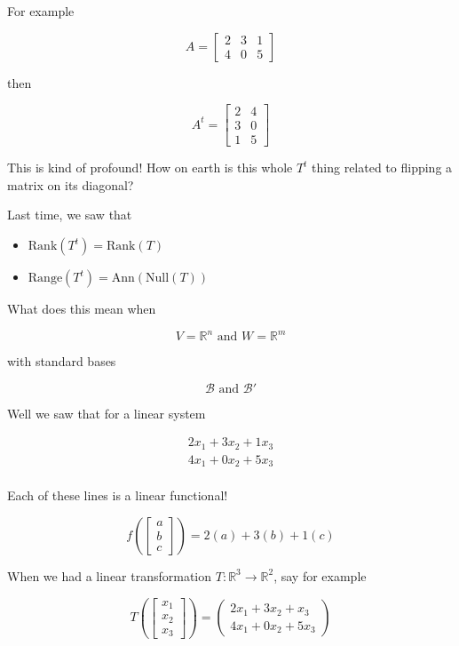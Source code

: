 \documentclass[12pt]{article}
\def\R{{\mathbb R}}
\newcommand{\rank}{\mathrm{Rank}}
\def\Ann{\text{Ann}}
\def\B{\mathcal B}
\def\range{\text{Range}}
\def\Null{\text{Null}}
\begin{document}
  For example

  \[
    A = \begin{bmatrix}
      2 & 3 & 1 \\
      4 & 0 & 5
    \end{bmatrix}
  \]

  then

  \[
    A^t = \begin{bmatrix}
      2 & 4 \\
      3 & 0 \\
      1 & 5
    \end{bmatrix}
  \]

  This is kind of profound! How on earth is this whole $T^t$ thing related to
  flipping a matrix on its diagonal?


  Last time, we saw that

  \begin{itemize}
    \item $\rank(T^t) = \rank(T)$
    \item $\range(T^t) = \Ann(\Null(T))$
  \end{itemize}

  What does this mean when

  \[
    V = \R^n \text{ and } W = \R^m
  \]

  with standard bases

  \[
    \B \text{ and } \B'
  \]

  Well we saw that for a linear system

  \begin{align*}
    2x_1 + 3x_2 + 1x_3 \\
    4x_1 + 0x_2 + 5x_3 \\
  \end{align*}

  Each of these lines is a linear functional!

  \[
    f\left(\begin{bmatrix} a \\ b \\ c \end{bmatrix}\right) = 2(a) + 3(b) + 1(c)
  \]

  When we had a linear transformation $T: \R^3 \to \R^2$, say for example

  \[
    T\left(\begin{bmatrix} x_1 \\ x_2 \\ x_3 \end{bmatrix}\right) = \begin{pmatrix}
      2x_1 + 3x_2 + x_3 \\
      4x_1 + 0x_2 + 5x_3
    \end{pmatrix}
  \]
\end{document}
